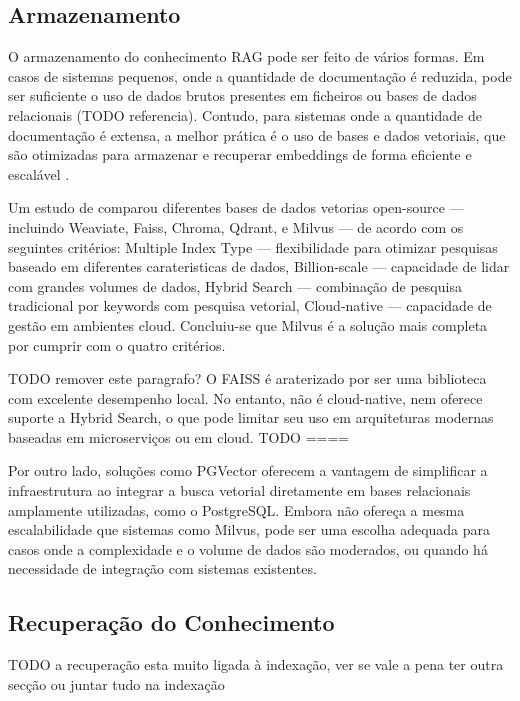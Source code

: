 \subsection{Armazenamento}

O armazenamento do conhecimento RAG pode ser feito de vários formas. Em casos de sistemas pequenos, onde a quantidade de documentação é reduzida, pode ser suficiente o uso de dados brutos presentes em ficheiros ou bases de dados relacionais (TODO referencia). Contudo, para sistemas onde a quantidade de documentação é extensa, a melhor prática é o uso de bases e dados vetoriais, que são otimizadas para armazenar e recuperar embeddings de forma eficiente e escalável \parencite{wang2024searching}. 

Um estudo de \cite{wang2024searching} comparou diferentes bases de dados vetorias open-source  — incluindo Weaviate, Faiss, Chroma, Qdrant, e Milvus  — de acordo com os seguintes critérios: Multiple Index Type — flexibilidade para otimizar pesquisas baseado em diferentes carateristicas de dados, Billion-scale — capacidade de lidar com grandes volumes de dados, Hybrid Search — combinação de pesquisa tradicional por keywords com pesquisa vetorial, Cloud-native — capacidade de gestão em ambientes cloud. Concluiu-se que Milvus é a solução mais completa por cumprir com o quatro critérios. 


TODO remover este paragrafo? 
O FAISS é araterizado por ser uma biblioteca com excelente desempenho local. No entanto, não é cloud-native, nem oferece suporte a Hybrid Search, o que pode limitar seu uso em arquiteturas modernas baseadas em microserviços ou em cloud.
TODO ====

Por outro lado, soluções como PGVector oferecem a vantagem de simplificar a infraestrutura ao integrar a busca vetorial diretamente em bases relacionais amplamente utilizadas, como o PostgreSQL. Embora não ofereça a mesma escalabilidade que sistemas como Milvus, pode ser uma escolha adequada para casos onde a complexidade e o volume de dados são moderados, ou quando há necessidade de integração com sistemas existentes.


\subsection{Recuperação do Conhecimento}

TODO a recuperação esta muito ligada à indexação, ver se vale a pena ter outra secção ou juntar tudo na indexação

\label{recu-context}

